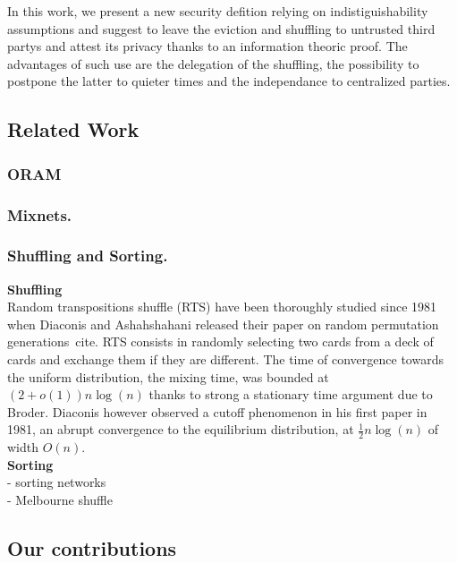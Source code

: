 \documentclass[a4paper]{article}
\begin{document}
In this work, we present a new security defition relying on indistiguishability assumptions and suggest to leave the eviction and shuffling to untrusted third partys and attest its privacy thanks to an information theoric proof.
The advantages of such use are the delegation of the shuffling, the possibility to postpone the latter to quieter times and the independance to centralized parties.

\subsection{Related Work}
\subsubsection{ORAM}

\subsubsection{Mixnets.}

\subsubsection{Shuffling and Sorting.}


\noindent\textbf{Shuffling} \\

Random transpositions shuffle (RTS) have been thoroughly studied since 1981 when Diaconis and Ashahshahani released their paper on random permutation generations~cite{}.
RTS consists in randomly selecting two cards from a deck of cards and exchange them if they are different.
The time of convergence towards the uniform distribution, the mixing time, was bounded at $\left(2+o(1)\right)n\log(n)$ thanks to strong a stationary time argument due to Broder\cite{}.
Diaconis however observed a cutoff phenomenon in his first paper in 1981, an abrupt convergence to the equilibrium distribution, at $\frac{1}{2}n\log(n)$ of width $O(n)$.\\

\noindent\textbf{Sorting} \\
- sorting networks\\
- Melbourne shuffle\\

\subsection{Our contributions}
\end{document}
